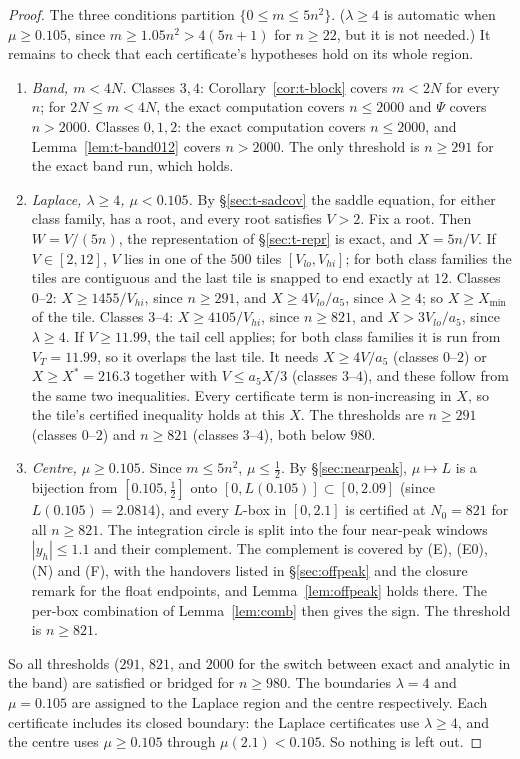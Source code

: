 \begin{proof}
The three conditions partition $\{0\le m\le5n^2\}$. ($\lambda\ge4$ is automatic when $\mu\ge0.105$, since
$m\ge1.05n^2>4(5n+1)$ for $n\ge22$, but it is not needed.) It remains to check that each certificate's hypotheses hold on
its whole region.
\begin{enumerate}
\item \emph{Band, $m<4N$.} Classes $3,4$: Corollary~\ref{cor:t-block} covers $m<2N$ for every $n$; for $2N\le m<4N$, the
exact computation covers $n\le2000$ and $\Psi$ covers $n>2000$. Classes $0,1,2$: the exact computation covers $n\le2000$,
and Lemma~\ref{lem:t-band012} covers $n>2000$. The only threshold is $n\ge291$ for the exact band run, which holds.
\item \emph{Laplace, $\lambda\ge4$, $\mu<0.105$.} By \S\ref{sec:t-sadcov} the saddle equation, for either class family,
has a root, and every root satisfies $V>2$. Fix a root. Then $W=V/(5n)$, the representation of \S\ref{sec:t-repr} is
exact, and $X=5n/V$. If $V\in[2,12]$, $V$ lies in one of the $500$ tiles $[V_{lo},V_{hi}]$; for both class families the
tiles are contiguous and the last tile is snapped to end exactly at $12$. Classes $0$--$2$: $X\ge1455/V_{hi}$, since
$n\ge291$, and $X\ge4V_{lo}/a_5$, since $\lambda\ge4$; so $X\ge X_{\min}$ of the tile. Classes $3$--$4$:
$X\ge4105/V_{hi}$, since $n\ge821$, and $X>3V_{lo}/a_5$, since $\lambda\ge4$. If $V\ge11.99$, the tail cell applies; for
both class families it is run from $V_T=11.99$, so it overlaps the last tile. It needs $X\ge4V/a_5$ (classes $0$--$2$) or
$X\ge X^*=216.3$ together with $V\le a_5X/3$ (classes $3$--$4$), and these follow from the same two inequalities. Every
certificate term is non-increasing in $X$, so the tile's certified inequality holds at this $X$. The thresholds are
$n\ge291$ (classes $0$--$2$) and $n\ge821$ (classes $3$--$4$), both below $980$.
\item \emph{Centre, $\mu\ge0.105$.} Since $m\le5n^2$, $\mu\le\tfrac12$. By \S\ref{sec:nearpeak}, $\mu\mapsto L$ is a
bijection from $[0.105,\tfrac12]$ onto $[0,L(0.105)]\subset[0,2.09]$ (since $L(0.105)=2.0814$), and every $L$-box in
$[0,2.1]$ is certified at $N_0=821$ for all $n\ge821$. The integration circle is split into the four near-peak windows
$|y_h|\le1.1$ and their complement. The complement is covered by (E), (E0), (N) and (F), with the handovers listed in
\S\ref{sec:offpeak} and the closure remark for the float endpoints, and Lemma~\ref{lem:offpeak} holds there. The per-box
combination of Lemma~\ref{lem:comb} then gives the sign. The threshold is $n\ge821$.
\end{enumerate}
So all thresholds ($291$, $821$, and $2000$ for the switch between exact and analytic in the band) are satisfied or bridged
for $n\ge980$. The boundaries $\lambda=4$ and $\mu=0.105$ are assigned to the Laplace region and the centre respectively.
Each certificate includes its closed boundary: the Laplace certificates use $\lambda\ge4$, and the centre uses
$\mu\ge0.105$ through $\mu(2.1)<0.105$. So nothing is left out.
\end{proof}

